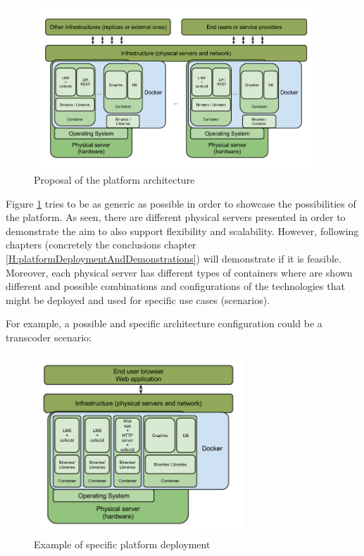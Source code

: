\begin{figure}[!htb]
\begin{center}
\includegraphics[width=0.95\textwidth]{./images/overallArchProp.png}
\caption{Proposal of the platform architecture}
\label{F:overallArchProp}
\end{center}
\end{figure}

Figure \ref{F:overallArchProp} tries to be as generic as possible in order to showcase the possibilities of the platform. As seen, there are different physical servers presented in order to demonstrate the aim to also support flexibility and scalability. However, following chapters (concretely the conclusions chapter \ref{H:platformDeploymentAndDemonstrations}) will demonstrate if it is feasible. 
Moreover, each physical server has different types of containers where are shown different and possible combinations and configurations of the technologies that might be deployed and used for specific use cases (scenarios).

For example, a possible and specific architecture configuration could be a transcoder scenario:

\begin{figure}[!htb]
\begin{center}
\includegraphics[width=0.7\textwidth]{./images/exampleArch.png}
\caption{Example of specific platform deployment}
\label{F:exampleArch}
\end{center}
\end{figure}

